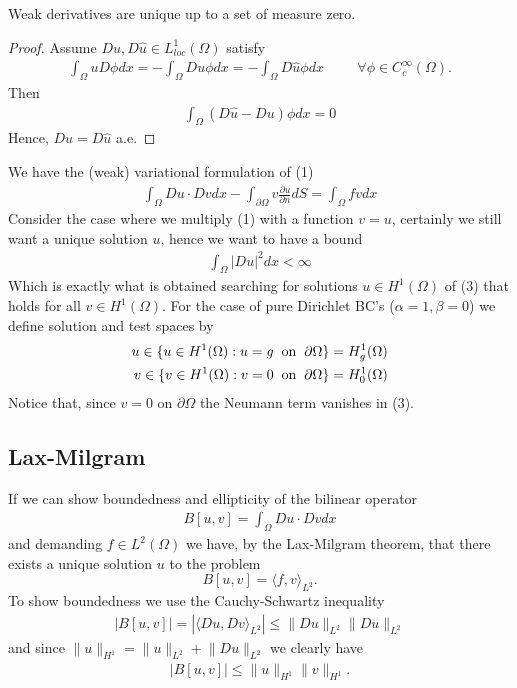 \documentclass[11pt, norsk, a4paper]{article}
\newcommand\norm[1]{\lVert#1\rVert}
\newcommand\inner[1]{\langle#1\rangle}
\begin{document}
Weak derivatives are unique up to a set of measure zero. 
\begin{proof}
    Assume $Du, D\hat{u} \in L^1_{loc}(\Omega)$ satisfy 
    \begin{align*}
        \int_\Omega uD\phi dx = -\int_\Omega Du\phi dx = -\int_\Omega D\hat{u}\phi dx \hspace{1cm} \forall \phi \in C^\infty_c(\Omega). 
    \end{align*}
    Then 
    \begin{align*}
        \int_\Omega (D\hat{u} - Du) \phi dx = 0 
    \end{align*}
    Hence, $Du = D\hat{u}$ a.e.
\end{proof}
We have the (weak) variational formulation of (1)
\begin{align}
     \int_\Omega D u \cdot D v dx -\int_{\partial \Omega} v\frac{\partial u}{\partial n} dS = \int_\Omega fv dx
\end{align}
Consider the case where we multiply (1) with a function $v = u$, certainly we still want a unique solution $u$, hence we want to have a bound 
\begin{align*}
    \int_\Omega |Du|^2 dx < \infty 
\end{align*}
Which is exactly what is obtained searching for solutions $u \in H^1(\Omega)$ of (3) that holds for all $v \in H^1(\Omega)$. For the case of pure Dirichlet BC's ($\alpha = 1, \beta = 0$) we define solution and test spaces by 
\begin{align*}
    u \in \{u \in H^1(\Omega) : u = g \hspace{0.2cm} \text{on} \hspace{0.2cm}\partial \Omega\} = H^1_g(\Omega)\\
    v \in \{v \in H^1(\Omega) : v = 0 \hspace{0.2cm} \text{on} \hspace{0.2cm} \partial \Omega\} = H^1_0(\Omega)
\end{align*}
Notice that, since $v = 0$ on $\partial \Omega$ the Neumann term vanishes in (3). 
\subsection*{Lax-Milgram}
If we can show boundedness and ellipticity of the bilinear operator 
\begin{align*}
    B[u,v] = \int_\Omega Du\cdot Dv dx
\end{align*}
and demanding $f \in L^2(\Omega)$ we have, by the Lax-Milgram theorem, that there exists a unique solution $u$ to the problem
$$B[u,v] = \inner{f,v}_{L^2}.$$
To show boundedness we use the Cauchy-Schwartz inequality 
\begin{align*}
    |B[u,v]| = |\inner{Du, Dv}_{L^2}| \leq \norm{Du}_{L^2}\norm{Du}_{L^2}
\end{align*}
and since $\norm{u}_{H^1} = \norm{u}_{L^2}+\norm{Du}_{L^2}$ we clearly have 
\begin{align*}
    |B[u,v]|\leq \norm{u}_{H^1}\norm{v}_{H^1}.
\end{align*}
\end{document}
